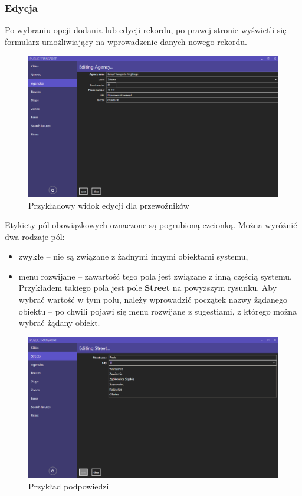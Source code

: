\documentclass[10pt,a4paper]{article}
\begin{document}
\subsubsection{Edycja}
Po wybraniu opcji dodania lub edycji rekordu, po prawej stronie wyświetli się formularz umożliwiający na wprowadzenie danych nowego rekordu.
\begin{figure}[H]
	\centering
	\includegraphics[width=15cm]{Resources/Images/08_edit_agency.png}
	\caption{Przykładowy widok edycji dla przewoźników}
\end{figure}
Etykiety pól obowiązkowych oznaczone są pogrubioną czcionką. Można wyróżnić dwa rodzaje pól:
\begin{itemize}
	\item zwykłe -- nie są związane z żadnymi innymi obiektami systemu,
	\item menu rozwijane -- zawartość tego pola jest związane z inną częścią systemu. Przykładem takiego pola jest pole \textbf{Street} na powyższym rysunku. Aby wybrać wartość w tym polu, należy wprowadzić początek nazwy żądanego obiektu -- po chwili pojawi się menu rozwijane z sugestiami, z którego można wybrać żądany obiekt.
\end{itemize}
\begin{figure}[H]
	\centering
	\includegraphics[width=15cm]{Resources/Images/06_edit_street.png}
	\caption{Przykład podpowiedzi}
\end{figure}
\end{document}

